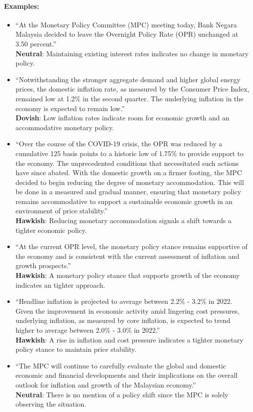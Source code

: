\paragraph{Examples: }
\begin{itemize}
    \item ``At the Monetary Policy Committee (MPC) meeting today, Bank Negara Malaysia decided to leave the Overnight Policy Rate (OPR) unchanged at 3.50 percent.''\\
    \textbf{Neutral}: Maintaining existing interest rates indicates no change in monetary policy.
    
    \item ``Notwithstanding the stronger aggregate demand and higher global energy prices, the domestic inflation rate, as measured by the Consumer Price Index, remained low at 1.2\% in the second quarter. The underlying inflation in the economy is expected to remain low.''\\
    \textbf{Dovish}: Low inflation rates indicate room for economic growth and an accommodative monetary policy.

    \item ``Over the course of the COVID-19 crisis, the OPR was reduced by a cumulative 125 basis points to a historic low of 1.75\% to provide support to the economy. The unprecedented conditions that necessitated such actions have since abated. With the domestic growth on a firmer footing, the MPC decided to begin reducing the degree of monetary accommodation. This will be done in a measured and gradual manner, ensuring that monetary policy remains accommodative to support a sustainable economic growth in an environment of price stability.''\\
    \textbf{Hawkish}: Reducing monetary accommodation signals a shift towards a tighter economic policy.
    
    \item ``At the current OPR level, the monetary policy stance remains supportive of the economy and is consistent with the current assessment of inflation and growth prospects.''\\
    \textbf{Hawkish}: A monetary policy stance that supports growth of the economy indicates an tighter approach.
    
    \item ``Headline inflation is projected to average between 2.2\% - 3.2\% in 2022. Given the improvement in economic activity amid lingering cost pressures, underlying inflation, as measured by core inflation, is expected to trend higher to average between 2.0\% - 3.0\% in 2022.''\\
    \textbf{Hawkish}: A rise in inflation and cost pressure indicates a tighter monetary policy stance to maintain price stability.

    \item ``The MPC will continue to carefully evaluate the global and domestic economic and financial developments and their implications on the overall outlook for inflation and growth of the Malaysian economy.''\\
    \textbf{Neutral}: There is no mention of a policy shift since the MPC is solely observing the situation.
\end{itemize}

